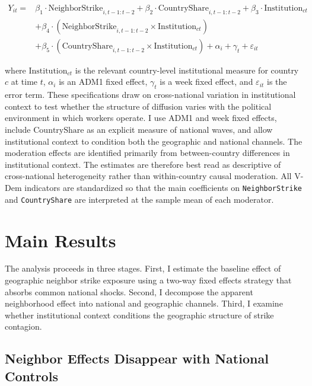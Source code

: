 \documentclass[
  11pt,
]{article}
\begin{document}
\[
\begin{aligned}
Y_{it} ={}& \beta_1 \cdot \text{NeighborStrike}_{i,t-1:t-2}
          + \beta_2 \cdot \text{CountryShare}_{i,t-1:t-2}
          + \beta_3 \cdot \text{Institution}_{ct} \\
         &+ \beta_4 \cdot (\text{NeighborStrike}_{i,t-1:t-2} \times \text{Institution}_{ct}) \\
         &+ \beta_5 \cdot (\text{CountryShare}_{i,t-1:t-2} \times \text{Institution}_{ct})
          + \alpha_i + \gamma_t + \varepsilon_{it}
\end{aligned}
\]

\noindent where \(\text{Institution}_{ct}\) is the relevant
country-level institutional measure for country \(c\) at time \(t\),
\(\alpha_i\) is an ADM1 fixed effect, \(\gamma_t\) is a week fixed
effect, and \(\varepsilon_{it}\) is the error term. These specifications
draw on cross-national variation in institutional context to test
whether the structure of diffusion varies with the political environment
in which workers operate. I use ADM1 and week fixed effects, include
\(\text{CountryShare}\) as an explicit measure of national waves, and
allow institutional context to condition both the geographic and
national channels. The moderation effects are identified primarily from
between-country differences in institutional context. The estimates are
therefore best read as descriptive of cross-national heterogeneity
rather than within-country causal moderation. All V-Dem indicators are
standardized so that the main coefficients on \texttt{NeighborStrike}
and \texttt{CountryShare} are interpreted at the sample mean of each
moderator.

\section{Main Results}\label{main-results}

The analysis proceeds in three stages. First, I estimate the baseline
effect of geographic neighbor strike exposure using a two-way fixed
effects strategy that absorbs common national shocks. Second, I
decompose the apparent neighborhood effect into national and geographic
channels. Third, I examine whether institutional context conditions the
geographic structure of strike contagion.

\subsection{Neighbor Effects Disappear with National
Controls}\label{neighbor-effects-disappear-with-national-controls}
\end{document}

